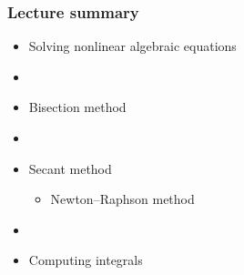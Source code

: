 \documentclass[english,14pt]{beamer}
\begin{document}
\begin{frame}[fragile]

\frametitle{Lecture summary}
\begin{itemize}
	\item Solving nonlinear algebraic equations

	\item[]
	
	\item Bisection method

	\item[]
	
	\item Secant method
	\begin{itemize}
		\item Newton--Raphson method
	\end{itemize}
	
	\item[]
	
	\item Computing integrals
		
\end{itemize}

\end{frame}
\end{document}
